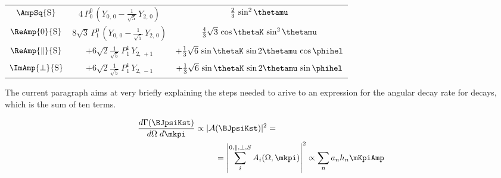\begin{table}[!h]
\begin{tabular}{ccc}
    \hline
    $\AmpSq{{\text{S}}}$  &
      $4\, P_0^0\, (Y_{0,\,0} - \tfrac{1}{\sqrt{5}}\, Y_{2,\,0})$  &
      $\tfrac{2}{3}\, \sin^2\thetamu$  \\

    $\ReAmp{0}{{\text{S}}}$  &
      $8\sqrt{3}\, P_1^0\, (Y_{0,\,0} - \tfrac{1}{\sqrt{5}}\, Y_{2,\,0})$  &
      $\tfrac{4}{3}\sqrt{3}\, \cos\thetaK\, \sin^2\thetamu$  \\

    $\ReAmp{\parallel}{{\text{S}}}$  &
      $+6\sqrt{2}\tfrac{1}{\sqrt{5}}\, P_1^1\, Y_{2,\,+1}$  &
      $+\tfrac{1}{3}\sqrt{6}\, \sin\thetaK\, \sin2\thetamu\, \cos\phihel$  \\

    $\ImAmp{\perp}{{\text{S}}}$  &
      $+6\sqrt{2}\tfrac{1}{\sqrt{5}}\, P_1^1\, Y_{2,\,-1}$  &
      $+\tfrac{1}{3}\sqrt{6}\, \sin\thetaK\, \sin2\thetamu\, \sin\phihel$  \\
    \hline
  \end{tabular}
\end{table}  
 
The current paragraph aims at very briefly explaining the steps needed to arive to an expression for the angular decay rate for \BsJpsiKst decays, which is the sum of ten terms.  

\begin{align}
  \frac{d\Gamma(\text{\BJpsiKst})}{d\Omega\;d\mkpi} \propto |\mathcal{A}&(\text{\BJpsiKst})|^2 = \nonumber \\
                                                    &= \left| \sum_i^{0,\parallel,\perp,S} A_i(\Omega,\mkpi) \right|^2  \propto \sum_n a_n h_n \mKpiAmp
  \label{ang_terms}
\end{align}

